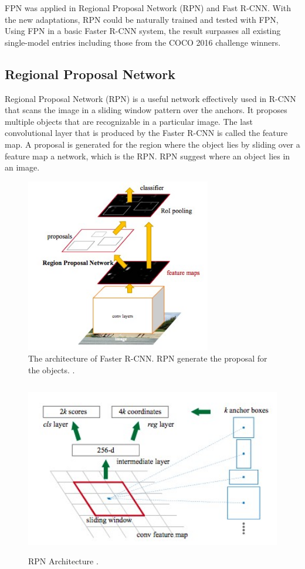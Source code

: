 {FPN was applied in Regional Proposal Network (RPN) and Fast R-CNN. With the new adaptations, RPN could be naturally trained and tested with FPN, Using FPN in a basic Faster R-CNN system, the result surpasses all existing single-model entries including those from the COCO 2016 challenge winners.

\subsection{Regional Proposal Network}
Regional Proposal Network (RPN) is a useful network effectively used in R-CNN that scans the image in a sliding window pattern over the anchors.  It proposes multiple objects that are recognizable in a particular image. The last convolutional layer that is produced by the Faster R-CNN is called the feature map. A proposal is generated for the region where the object lies by sliding over a feature map a network, which is the RPN. RPN suggest where an object lies in an image.
\begin{figure}[H]
\centering
  \includegraphics[height=3in]{images/rcnn-rpn.jpg}
   \caption{The architecture of Faster R-CNN. RPN generate the proposal for the objects. \protect\cite{J}.}
\end{figure}

\begin{figure}[H]
\centering
  \includegraphics[height=3in]{images/rpn-arch.jpg}
   \caption{RPN Architecture \protect\cite{J}.}
\end{figure}

}
